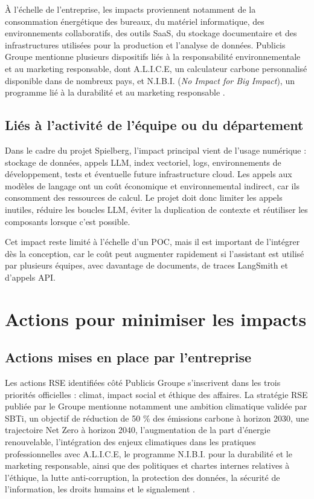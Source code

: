 \documentclass[a4paper,11pt,english,openany]{book}
\begin{document}
\begin{appendices}
À l'échelle de l'entreprise, les impacts proviennent notamment de la consommation énergétique des bureaux, du matériel informatique, des environnements collaboratifs, des outils SaaS, du stockage documentaire et des infrastructures utilisées pour la production et l'analyse de données. Publicis Groupe mentionne plusieurs dispositifs liés à la responsabilité environnementale et au marketing responsable, dont A.L.I.C.E, un calculateur carbone personnalisé disponible dans de nombreux pays, et N.I.B.I. (\textit{No Impact for Big Impact}), un programme lié à la durabilité et au marketing responsable \cite{publiciscsrstrategy,publiciscsrsustvalue}.

\subsection{Liés à l'activité de l'équipe ou du département}

Dans le cadre du projet Spielberg, l'impact principal vient de l'usage numérique : stockage de données, appels LLM, index vectoriel, logs, environnements de développement, tests et éventuelle future infrastructure cloud. Les appels aux modèles de langage ont un coût économique et environnemental indirect, car ils consomment des ressources de calcul. Le projet doit donc limiter les appels inutiles, réduire les boucles LLM, éviter la duplication de contexte et réutiliser les composants lorsque c'est possible.

Cet impact reste limité à l'échelle d'un POC, mais il est important de l'intégrer dès la conception, car le coût peut augmenter rapidement si l'assistant est utilisé par plusieurs équipes, avec davantage de documents, de traces LangSmith et d'appels API.

\section{Actions pour minimiser les impacts}

\subsection{Actions mises en place par l'entreprise}

Les actions RSE identifiées côté Publicis Groupe s'inscrivent dans les trois priorités officielles : climat, impact social et éthique des affaires. La stratégie RSE publiée par le Groupe mentionne notamment une ambition climatique validée par SBTi, un objectif de réduction de 50 \% des émissions carbone à horizon 2030, une trajectoire Net Zero à horizon 2040, l'augmentation de la part d'énergie renouvelable, l'intégration des enjeux climatiques dans les pratiques professionnelles avec A.L.I.C.E, le programme N.I.B.I. pour la durabilité et le marketing responsable, ainsi que des politiques et chartes internes relatives à l'éthique, la lutte anti-corruption, la protection des données, la sécurité de l'information, les droits humains et le signalement \cite{publiciscsrsmartdata}.


\end{appendices}
\end{document}
